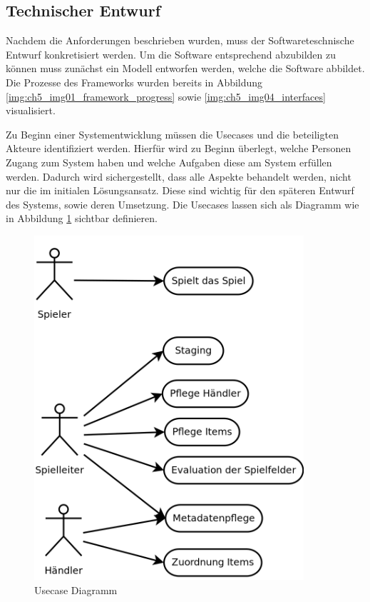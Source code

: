 

\subsection*{Technischer Entwurf}

Nachdem die Anforderungen beschrieben wurden, muss der Softwareteschnische Entwurf konkretisiert werden.
Um die Software entsprechend abzubilden zu können muss zunächst ein Modell entworfen werden, welche die Software abbildet. Die Prozesse des Frameworks wurden bereits in Abbildung \ref{img:ch5_img01_framework_progress} sowie \ref{img:ch5_img04_interfaces} visualisiert.

Zu Beginn einer Systementwicklung müssen die Usecases und die beteiligten Akteure identifiziert werden.
Hierfür wird zu Beginn überlegt, welche Personen Zugang zum System haben und welche Aufgaben diese am System erfüllen werden.
Dadurch wird sichergestellt, dass alle Aspekte behandelt werden, nicht nur die im initialen Lösungsansatz. Diese sind wichtig für den späteren Entwurf des Systems, sowie deren Umsetzung.
Die Usecases lassen sich als Diagramm wie in Abbildung \ref{img:ch5_img06_usecases} sichtbar definieren.



\begin{figure}[H]
\begin{center}
\includegraphics[width=100mm]{images/ch5_img06_usecases.png}
\caption{Usecase Diagramm}
\label{img:ch5_img06_usecases}
\end{center}
\end{figure}

